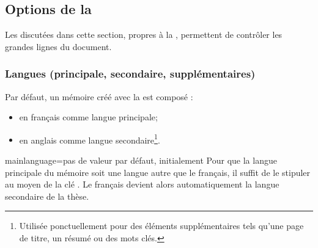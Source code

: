 \subsection{Options de la \yatcl}\label{sec:options-yatcl}

Les  discutées dans cette section, propres à la \yatcl{},
permettent de contrôler les grandes lignes du document.


\subsubsection{Langues (principale, secondaire, supplémentaires)}\label{sec:langues}

Par défaut, un mémoire créé avec la \yatcl est composé :
\begin{itemize}
\item en français comme langue principale;
\item en anglais comme langue secondaire\footnote{Utilisée ponctuellement pour
    des éléments supplémentaires tels qu'une page de titre, un résumé ou des
    mots clés.}.
\end{itemize}
%
\begin{docKey}{mainlanguage}{=\textbar{}}{pas de valeur par défaut,
    initialement }
  Pour que la langue principale  du mémoire soit
  une langue autre que le français, il suffit de le stipuler au moyen de la clé
  . Le français devient alors automatiquement la langue
  secondaire de la thèse.
\end{docKey}

